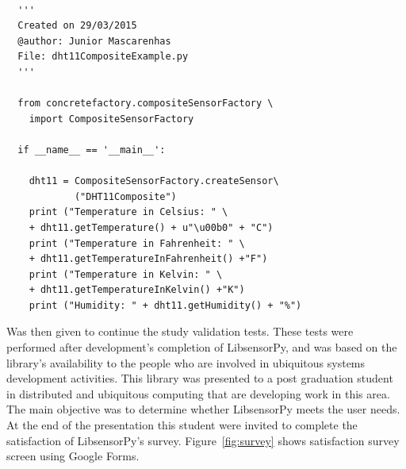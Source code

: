 \documentclass{acm_proc_article-sp}
\begin{document}
\renewcommand{\theFancyVerbLine}{
  \sffamily\textcolor[rgb]{0.5,0.5,0.5}{\scriptsize\arabic{FancyVerbLine}}}
\begin{verbatim}

  '''
  Created on 29/03/2015
  @author: Junior Mascarenhas
  File: dht11CompositeExample.py
  '''
  
  from concretefactory.compositeSensorFactory \
  	import CompositeSensorFactory

  if __name__ == '__main__':

    dht11 = CompositeSensorFactory.createSensor\
    	    ("DHT11Composite")
    print ("Temperature in Celsius: " \
    + dht11.getTemperature() + u"\u00b0" + "C")
    print ("Temperature in Fahrenheit: " \
    + dht11.getTemperatureInFahrenheit() +"F")
    print ("Temperature in Kelvin: " \
    + dht11.getTemperatureInKelvin() +"K")
    print ("Humidity: " + dht11.getHumidity() + "%")
\end{verbatim}
Was then given to continue the study validation tests. These tests were performed after development's completion of LibsensorPy, and was based on the library's availability to the people who are involved in ubiquitous systems development activities.
\newline
\newline
This library was presented to a post graduation student in distributed and ubiquitous computing that are developing work in this area. The main objective was to determine whether LibsensorPy meets the user needs.
\newline
\newline
At the end of the presentation this student were invited to complete the satisfaction of LibsensorPy's survey. Figure~\ref{fig:survey} shows satisfaction survey screen using Google Forms.
\newline
\newline

\end{document}
